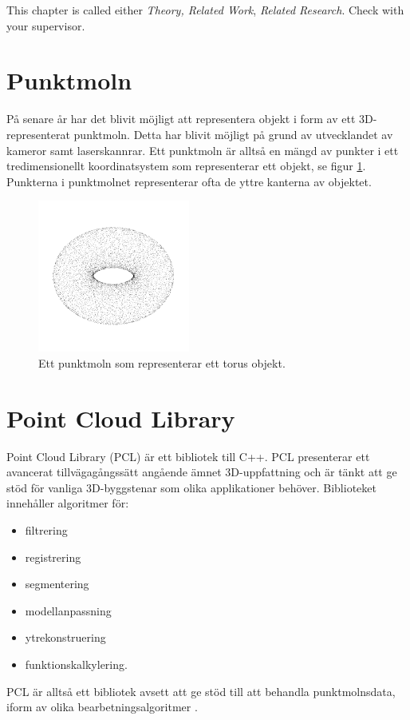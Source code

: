 This chapter is called either \emph{Theory, Related Work}, 
\emph{Related Research}. Check with your supervisor.
\newpage










\section{Punktmoln}
På senare år har det blivit möjligt att representera objekt i form av ett 3D-representerat punktmoln. Detta har blivit möjligt på grund av utvecklandet av kameror samt laserskannrar. Ett punktmoln är alltså en mängd av punkter i ett tredimensionellt koordinatsystem som representerar ett objekt, se figur \ref{fig:point_cloud_torus}. Punkterna i punktmolnet representerar ofta de yttre kanterna av objektet.

\begin{figure}[H]
	\centering
	\includegraphics[width=50mm]{figures/Point_cloud_torus.png}
	\caption{Ett punktmoln som representerar ett torus objekt.}
	\label{fig:point_cloud_torus}
\end{figure}


\section{Point Cloud Library}
Point Cloud Library (PCL) är ett bibliotek till C++. PCL presenterar ett avancerat tillvägagångssätt angående ämnet 3D-uppfattning och är tänkt att ge stöd för vanliga 3D-byggstenar som olika applikationer behöver. Biblioteket innehåller algoritmer för:

\begin{itemize}
	\item filtrering
	\item registrering
	\item segmentering
	\item modellanpassning
	\item ytrekonstruering
	\item funktionskalkylering.
\end{itemize}
PCL är alltså ett bibliotek avsett att ge stöd till att behandla punktmolnsdata, iform av olika bearbetningsalgoritmer \cite{rusu20113d}.

